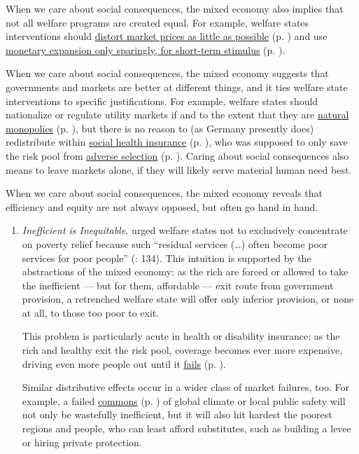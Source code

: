 \begin{enumerate}
	When we care about social consequences, the mixed economy also implies that not all welfare programs are created equal. For example, welfare states interventions should \hyperref[sec:minimalDWL]{distort market prices as little as possible} (p. \pageref{sec:minimalDWL}) and use \hyperref[sec:pricestability]{monetary expansion only sparingly, for short-term stimulus} (p. \pageref{sec:pricestability}).
	
	When we care about social consequences, the mixed economy suggests that  governments and markets are better at different things, and it ties welfare state interventions to specific justifications. For example, welfare states should nationalize or regulate utility markets if and to the extent that they are \hyperref[sec:naturalmonopoly]{natural monopolies} (p. \pageref{sec:naturalmonopoly}), but there is no reason to (as Germany presently does) redistribute within \hyperref[sec:stateinsurance]{social health insurance} (p. \pageref{sec:stateinsurance}), who was supposed to only save the risk pool from \hyperref[sec:adverseselection]{adverse selection} (p. \pageref{sec:adverseselection}). Caring about social consequences also means to leave markets alone, if they will likely serve material human need best.
	
	When we care about social consequences, the mixed economy reveals that efficiency and equity are not always opposed, but often go hand in hand. 
	\begin{enumerate}
		\item \emph{Inefficient is Inequitable.} \citeauthor{Titmuss1974} urged welfare states not to exclusively concentrate on poverty relief because such ``residual services (\ldots) often become poor services for poor people'' (\citeyear{Titmuss1974}: 134). This intuition is supported by the abstractions of the mixed economy: as the rich are forced or allowed to take the inefficient --- but for them, affordable --- exit route from government provision, a retrenched welfare state will offer only inferior provision, or none at all, to those too poor to exit. 
		
		This problem is particularly acute in health or disability insurance: as the rich and healthy exit the risk pool, coverage becomes ever more expensive, driving even more people out until it \hyperref[sec:adverseselection]{fails} (p. \pageref{sec:adverseselection}). 
		
		Similar distributive effects occur in a wider class of market failures, too. For example, a failed \hyperref[sec:commongood]{commons} (p. \pageref{sec:commongood}) of global climate or local public safety will not only be wastefully inefficient, but it will also hit hardest the poorest regions and people, who can least afford substitutes, such as building a levee or hiring private protection. 
		

\end{enumerate}
\end{enumerate}
